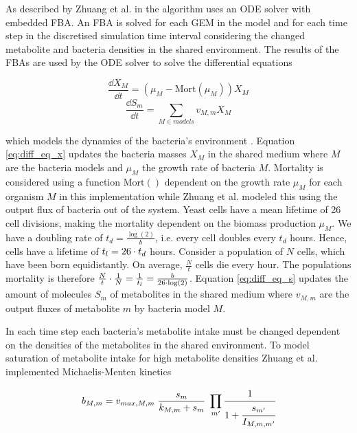 As described by Zhuang et al. in \cite{zhuang_genome-scale_2011} the algorithm uses an ODE solver with embedded FBA. An FBA is solved
for each GEM in the model and for each time step in the discretised simulation time interval considering the changed metabolite and
bacteria densities in the shared environment. The results of the FBAs are used by the ODE solver to solve the differential equations

\begin{equation} \label{eq:diff_eq_x}
	\frac{\dd X_M}{\dd t} = (\mu_M - \mathrm{Mort}(\mu_M)) X_M
\end{equation}
\begin{equation} \label{eq:diff_eq_s}
	\frac{\dd S_m}{\dd t} = \displaystyle\sum_{M \in models} v_{M,m} X_M
\end{equation}

which models the dynamics of the bacteria's environment \cite{zhuang_design_2012}. Equation \ref{eq:diff_eq_x} updates
the bacteria masses $X_M$ in the shared medium where $M$ are the bacteria models and $\mu_M$ the growth rate of bacteria $M$.
Mortality is considered using a function $\mathrm{Mort}()$ dependent on the growth rate $\mu_M$ for each organism $M$ in this implementation while Zhuang et al. modeled this
using the output flux of bacteria out of the system.
Yeast cells have a mean lifetime of 26 cell divisions, making the mortality dependent on the biomass production $\mu_M$.
We have a doubling rate of $t_d=\frac{\log(2)}{b}$, i.e. every cell doubles every $t_d$ hours. Hence, cells have a lifetime of $t_l=26\cdot t_d$ hours.
Consider a population of $N$ cells, which have been born equidistantly. On average, $\frac{N}{t}$ cells die every hour.
The populations mortality is therefore $\frac{N}{t} \cdot \frac{1}{N}=\frac{1}{t_l}=\frac{b}{26\cdot \log(2)}$.
Equation \ref{eq:diff_eq_s} updates the amount of molecules $S_m$ of metabolites in the shared medium where $v_{M,m}$ are the
output fluxes of metabolite $m$ by bacteria model $M$.

In each time step each bacteria's metabolite intake must be changed dependent on the densities of the metabolites in the shared environment.
To model saturation of metabolite intake for high metabolite densities Zhuang et al. implemented Michaelis-Menten kinetics \cite{johnson2011original}

\begin{equation} \label{eq:michaelis-menten}
 b_{M,m} = v_{max,M,m} \; \frac{s_m}{k_{M,m}+s_m} \; \prod_{m'} \cfrac{1}{1+\cfrac{s_{m'}}{I_{M,m,m'}}}
\end{equation}


